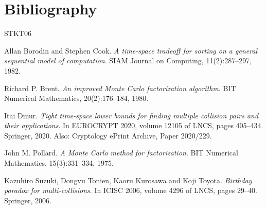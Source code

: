 \documentclass{aicr-conjecture}
\begin{document}
\section{Bibliography}

\begin{aicrbibliography}{STKT06}

Allan Borodin and Stephen Cook.
\emph{A time-space tradeoff for sorting on a general sequential model of computation}.
SIAM Journal on Computing, 11(2):287--297, 1982.

Richard P. Brent.
\emph{An improved Monte Carlo factorization algorithm}.
BIT Numerical Mathematics, 20(2):176--184, 1980.

Itai Dinur.
\emph{Tight time-space lower bounds for finding multiple collision pairs and their
applications}.
In EUROCRYPT 2020, volume 12105 of LNCS, pages 405--434. Springer, 2020.
Also: Cryptology ePrint Archive, Paper 2020/229.

John M. Pollard.
\emph{A Monte Carlo method for factorization}.
BIT Numerical Mathematics, 15(3):331--334, 1975.

Kazuhiro Suzuki, Dongvu Tonien, Kaoru Kurosawa and Koji Toyota.
\emph{Birthday paradox for multi-collisions}.
In ICISC 2006, volume 4296 of LNCS, pages 29--40. Springer, 2006.

\end{aicrbibliography}
\end{document}
